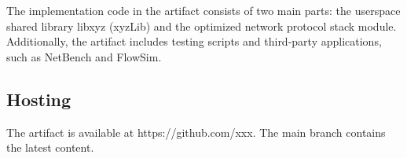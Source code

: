 The implementation code in the artifact consists of two main parts: the userspace shared library libxyz (xyzLib) and the optimized network protocol stack module. Additionally, the artifact includes testing scripts and third-party applications, such as NetBench and FlowSim.

\subsection{Hosting}

The artifact is available at https://github.com/xxx. The main branch contains the latest content.

%
%
%
%
